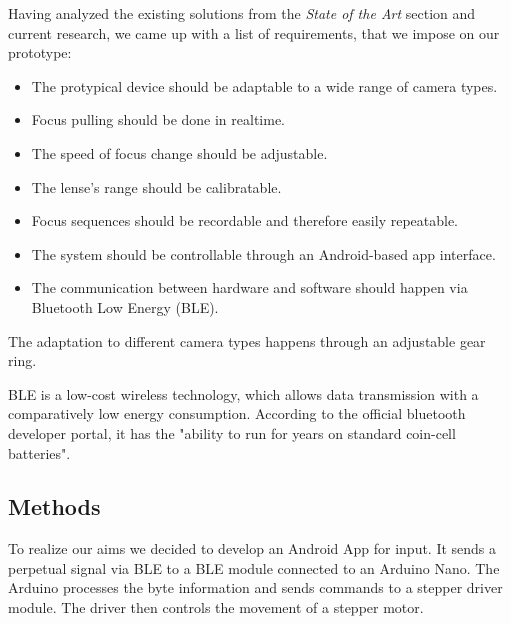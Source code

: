 \documentclass{sigchi}
\begin{document}
Having analyzed the existing solutions from the \textit{State of the Art} section and current research, we came up with a list of requirements, that we impose on our prototype:
\begin{itemize}
  \item The protypical device should be adaptable to a wide range of camera types. 
  \item Focus pulling should be done in realtime.
  \item The speed of focus change should be adjustable.
  \item The lense's range should be calibratable.
  \item Focus sequences should be recordable and therefore easily repeatable.
  \item The system should be controllable through an Android-based app interface.
  \item The communication between hardware and software should happen via Bluetooth Low Energy (BLE).
\end{itemize}

The adaptation to different camera types happens through an adjustable gear ring.

BLE is a low-cost wireless technology, which allows data transmission with a comparatively low energy consumption. According to the official bluetooth developer portal, it has the "ability to run for years on standard coin-cell batteries". \cite{ble}

\subsection{Methods}
To realize our aims we decided to develop an Android App for input. It sends a perpetual signal via BLE to a BLE module connected to an Arduino Nano. The Arduino processes the byte information and sends commands to a stepper driver module. The driver then controls the movement of a stepper motor. 
\end{document}
